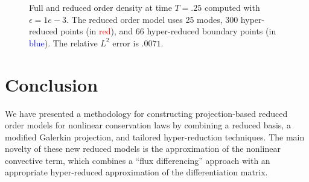 \documentclass[preprint,10pt]{elsarticle}
\theoremstyle{definition}
\theoremstyle{lemma}
\theoremstyle{theorem}
\theoremstyle{assumption}
\newcommand{\note}[1]{{\color{blue}{#1}}}
\begin{document}
\begin{figure}
\caption{Full and reduced order density at time $T = .25$ computed with $\epsilon = 1e-3$.  The reduced order model uses 25 modes, 300 hyper-reduced points (in \textcolor{red}{red}), and 66 hyper-reduced boundary points (in \textcolor{blue}{blue}).  The relative $L^2$ error is $.0071$.}
\label{fig:pulse2d}
\end{figure}




\section{Conclusion}  We have presented a methodology for constructing projection-based reduced order models for nonlinear conservation laws by combining a reduced basis, a modified Galerkin projection, and tailored hyper-reduction techniques.  The main novelty of these new reduced models is the approximation of the nonlinear convective term, which combines a ``flux differencing'' approach with an appropriate hyper-reduced approximation of the differentiation matrix.  
\end{document}
